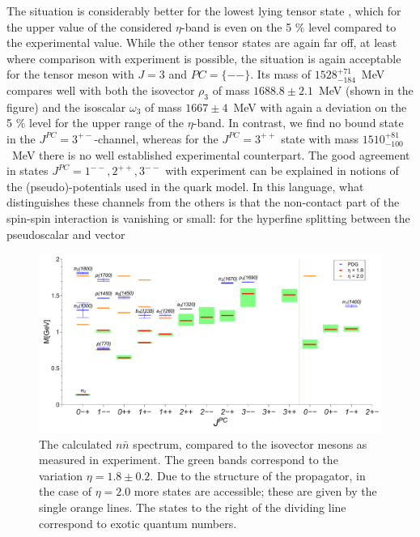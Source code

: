 The situation is considerably better for the lowest lying tensor state \cite{Krassnigg:2010mh}, which for the upper value of the considered $\eta$-band is even on the 5 $\%$ level compared to the experimental value. While the other tensor states are again far off, at least where comparison with experiment is possible, the situation is again acceptable for the tensor meson with $J=3$ and $PC=\{--\}$. Its mass of $1528^{+71}_{-184}$~MeV compares well with both the isovector $\rho_3$ of mass $1688.8\pm2.1$~MeV (shown in the figure) and the isoscalar $\omega_3$ of mass $1667\pm4$~MeV with again a deviation on the 5 $\%$ level for the upper range of the $\eta$-band. In contrast, we find no bound state in the $J^{PC}=3^{+-}$-channel, whereas for the $J^{PC}=3^{++}$ state with mass $1510^{+81}_{-100}$~MeV there is no well established experimental counterpart.
The good agreement in states $J^{PC}=1^{--},2^{++},3^{--}$ with experiment can be explained in notions of the (pseudo)-potentials used in the quark model. In this language, what distinguishes these channels from the others is that the non-contact part of the spin-spin interaction 
is vanishing or small: for the hyperfine splitting between the pseudoscalar and vector 
\begin{figure}
\begin{center}
\includegraphics[width=0.999\textwidth]{figures/spectrum_nn}
\caption{\footnotesize The calculated $n\bar{n}$ spectrum, compared to the isovector mesons as measured in 
experiment. The green bands correspond to the 
variation $\eta=1.8\pm0.2$. Due to the structure of the propagator, in the case of $\eta=2.0$ more states are accessible; 
these are given by the single orange lines. The states to the right of the dividing line correspond to exotic quantum 
numbers.}\label{fig:spectrumnn}
\end{center}
\end{figure}
